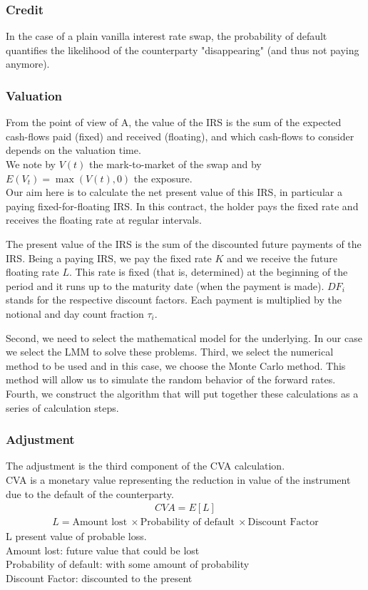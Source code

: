 \documentclass[11pt]{article}
\numberwithin{equation}{subsection}
\begin{document}
\subsubsection{Credit}
In the case of a plain vanilla interest rate swap, the probability of default quantifies the likelihood of the counterparty "disappearing" (and thus not paying anymore).
\subsubsection{Valuation}
From the point of view of A, the value of the IRS is the sum of the expected cash-flows paid (fixed) and received
(floating), and which cash-flows to consider depends on the valuation time.\\
We note by \(V(t)\) the mark-to-market of the swap and by \(E(V_t) = \max(V(t), 0)\) the exposure.\\


Our aim here is to calculate the net present value of this IRS, in particular a paying
fixed-for-floating IRS. In this contract, the holder pays the fixed rate and receives the
floating rate at regular intervals.

The present value of the IRS is the sum of the discounted future payments of the IRS.
Being a paying IRS, we pay the fixed rate \(K\) and we receive the future floating rate \(L\).
This rate is fixed (that is, determined) at the beginning of the period and it runs up to
the maturity date (when the payment is made). \(DF_{i}\) stands for the respective discount
factors. Each payment is multiplied by the notional and day count fraction \(\tau_{i}\).

Second, we need to select the mathematical model for the underlying. In our case we select the LMM to solve these problems. 
Third, we select the numerical method to be used and in this case, we choose the Monte Carlo method. 
This method will allow us to simulate the random behavior of the forward rates. Fourth, we construct the
algorithm that will put together these calculations as a series of calculation steps.

\subsubsection{Adjustment}
The adjustment is the third component of the CVA calculation. \\
\noindent CVA is a monetary value representing the reduction in value of the instrument due to the default of the counterparty.
\begin{eqnarray*}
CVA = E[L]
\end{eqnarray*}
\begin{eqnarray*}
L = \text{Amount lost} \ \times \text{Probability of default} \ \times \text{Discount Factor}
\end{eqnarray*}
L present value of probable loss. \\
Amount lost: future value that could be lost\\
Probability of default:  with some amount of probability\\
Discount Factor: discounted to the present
\end{document}
